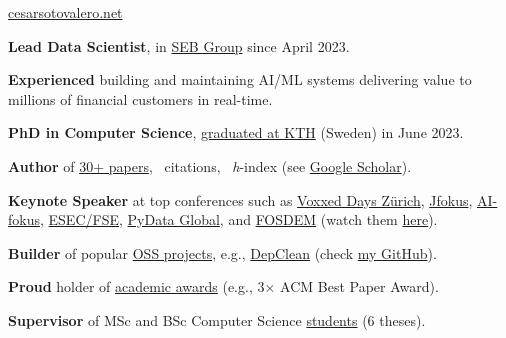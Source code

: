 \documentclass{files/CV/cesar}
\begin{document}


\ybPrintPhoto{}

{\scshape\bfseries\Large {}}

 \href{https://www.cesarsotovalero.net}{cesarsotovalero.net}

\onehalfspacing

\vspace{1.5em}

\textbf{Lead Data Scientist}, in \href{https://www.linkedin.com/in/cesarsotovalero/}{SEB Group} since April 2023.

\textbf{Experienced} building and maintaining AI/ML systems delivering value to millions of financial customers in real-time.

\textbf{PhD in Computer Science}, \href{https://kth.diva-portal.org/smash/record.jsf?pid=diva2%3A1755964&dswid=5947}{graduated at KTH} (Sweden) in June 2023.


\textbf{Author} of \href{https://www.cesarsotovalero.net/publications}{30+ papers}, \citations~citations, \hindex~\emph{h}-index (see \href{https://scholar.google.es/citations?user=jNBoowwAAAAJ&hl=en}{Google Scholar}).

\textbf{Keynote Speaker} at top conferences such as
  \href{https://youtu.be/59EVOp8r0aw}{Voxxed Days Zürich},
  \href{https://youtu.be/Xn1ShZPrw2o}{Jfokus},
  \href{https://youtu.be/kFPE9EcxhCs}{AI-fokus},
  \href{https://youtu.be/cePEl485E_s}{ESEC/FSE},
  \href{https://youtu.be/nEg8T8doy64}{PyData Global}, and
  \href{https://youtu.be/8SndbPMwdWE}{FOSDEM} (watch them \href{https://www.cesarsotovalero.net/talks}{here}).

\textbf{Builder} of popular \href{https://www.cesarsotovalero.net/software}{OSS projects}, e.g., \href{https://github.com/castor-software/depclean}{DepClean} (check \href{https://github.com/cesarsotovalero}{my GitHub}).

\textbf{Proud} holder of \href{https://www.cesarsotovalero.net/awards}{academic awards} (e.g., 3$\times$ ACM Best Paper Award).

\textbf{Supervisor} of MSc and BSc Computer Science \href{https://www.cesarsotovalero.net/service#thesis-supervisor}{students} (6 theses).
\end{document}
